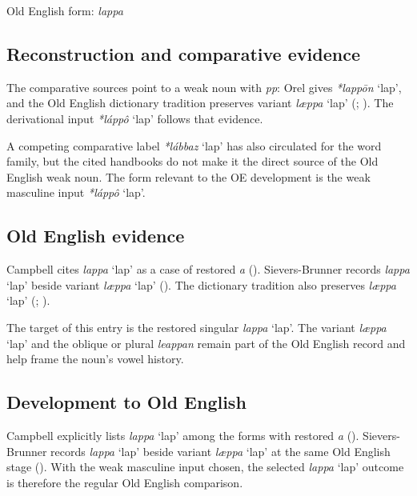 \documentclass[
  british,
  a4paper,
  openany]{book}
\providecommand{\Recon}[1]{\emph{*#1}}
{\catcode`→=\active \global\def→{\ensuremath{\rightarrow}}}
\providecommand{\Recon}[1]{\emph{*#1}}
{\catcode`→=\active \global\def→{\ensuremath{\rightarrow}}}
\begin{document}
Old English form: \emph{lappa}

\subsection{Reconstruction and comparative
evidence}\label{reconstruction-and-comparative-evidence-85}

The comparative sources point to a weak noun with \emph{pp}: Orel gives
\Recon{lappōn} `lap', and the Old English dictionary tradition preserves
variant \emph{læppa} `lap' (;
). The derivational
input \Recon{láppô} `lap' follows that evidence.

A competing comparative label \Recon{lábbaz} `lap' has also circulated
for the word family, but the cited handbooks do not make it the direct
source of the Old English weak noun. The form relevant to the OE
development is the weak masculine input \Recon{láppô} `lap'.

\subsection{Old English evidence}\label{old-english-evidence-85}

Campbell cites \emph{lappa} `lap' as a case of restored \emph{a}
(). Sievers-Brunner
records \emph{lappa} `lap' beside variant \emph{læppa} `lap'
(). The
dictionary tradition also preserves \emph{læppa} `lap'
(;
).

The target of this entry is the restored singular \emph{lappa} `lap'.
The variant \emph{læppa} `lap' and the oblique or plural \emph{leappan}
remain part of the Old English record and help frame the noun's vowel
history.

\subsection{Development to Old
English}\label{development-to-old-english-85}

Campbell explicitly lists \emph{lappa} `lap' among the forms with
restored \emph{a} (). Sievers-Brunner records \emph{lappa} `lap' beside variant
\emph{læppa} `lap' at the same Old English stage
(). With the
weak masculine input chosen, the selected \emph{lappa} `lap' outcome is
therefore the regular Old English comparison.
\end{document}
